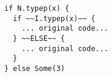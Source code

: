 \begin{lstlisting}[style=scalaioScala]
if N.typep(x) {
  if ~~I.typep(x)~~ {
    ... original code...
  } ~~ELSE~~ {
    ... original code...
  }
} else Some(3)
\end{lstlisting}
